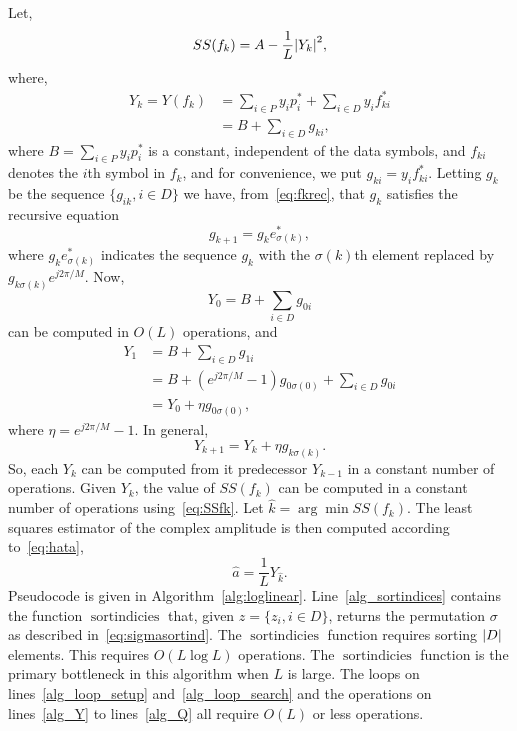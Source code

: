 \documentclass[journal]{IEEEtran}
\begin{document}
Let,
\begin{equation}\label{eq:SSfk}
SS(f_k) = A - \frac{1}{L}{\left\vert Y_k \right\vert}^2,
\end{equation}
where, 
\begin{align*}
Y_k = Y( f_k ) &= \sum_{i \in P} y_i p_i^*  + \sum_{i \in D} y_i f_{ki}^* \\
&= B + \sum_{i \in D}g_{ki},
\end{align*}
where $B = \sum_{i \in P} y_i p_i^*$ is a constant, independent of the data symbols, and $f_{ki}$ denotes the $i$th symbol in $f_k$, and for convenience, we put $g_{ki}  = y_i f_{ki}^*$.  Letting $g_{k}$ be the sequence $\{g_{ik}, i \in D\}$ we have, from~\eqref{eq:fkrec}, that $g_k$ satisfies the recursive equation
\[
g_{k+1} = g_{k} e_{\sigma(k)}^*,
\]
where $g_{k} e_{\sigma(k)}^*$ indicates the sequence $g_k$ with the $\sigma(k)$th element replaced by $g_{k \sigma(k)}e^{j2\pi/M}$.  Now,
\[
Y_0 = B + \sum_{i \in D} g_{0i}
\] 
can be computed in $O(L)$ operations, and
\begin{align*}
Y_1 &= B + \sum_{i \in D} g_{1i} \\
&= B +  (e^{j2\pi/M} - 1)g_{0\sigma(0)} + \sum_{i \in D} g_{0i} \\
&= Y_0 + \eta g_{0\sigma(0)},
\end{align*}
where $\eta = e^{j2\pi/M} - 1$.  In general,
\[
Y_{k+1} = Y_k + \eta g_{k\sigma(k)}.
\]
So, each $Y_k$ can be computed from it predecessor $Y_{k-1}$ in a constant number of operations.  Given $Y_k$, the value of $SS(f_k)$ can be computed in a constant number of operations using~\eqref{eq:SSfk}.  Let $\hat{k} = \arg\min SS(f_k)$.  The least squares estimator of the complex amplitude is then computed according to~\eqref{eq:hata},
\begin{equation}\label{eq:ahatYhat}
\hat{a} = \frac{1}{L} Y_{\hat{k}}.
\end{equation}
Pseudocode is given in Algorithm~\ref{alg:loglinear}.  Line~\ref{alg_sortindices} contains the function $\operatorname{sortindicies}$ that, given $z = \{z_i, i \in D\}$, returns the permutation $\sigma$ as described in~\eqref{eq:sigmasortind}.  The $\operatorname{sortindicies}$ function requires sorting ${\left\vert D \right\vert}$ elements.  This requires $O(L \log L)$ operations.  The $\operatorname{sortindicies}$ function is the primary bottleneck in this algorithm when $L$ is large.  The loops on lines~\ref{alg_loop_setup} and~\ref{alg_loop_search} and the operations on lines~\ref{alg_Y} to lines~\ref{alg_Q} all require $O(L)$ or less operations.  %
\end{document}
